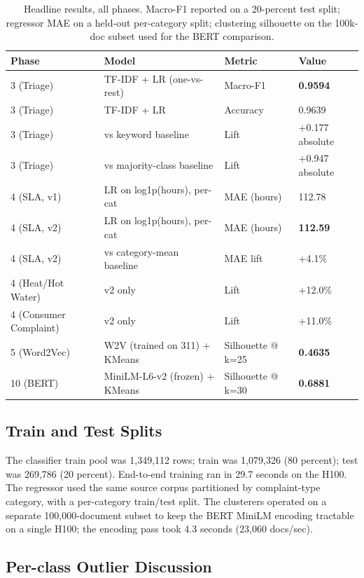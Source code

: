 \documentclass[11pt,letterpaper]{article}
\begin{document}
\begin{table}[h]
\centering
\small
\begin{tabular}{llll}
\toprule
\textbf{Phase} & \textbf{Model} & \textbf{Metric} & \textbf{Value} \\
\midrule
3 (Triage) & TF-IDF + LR (one-vs-rest) & Macro-F1 & \textbf{0.9594} \\
3 (Triage) & TF-IDF + LR & Accuracy & 0.9639 \\
3 (Triage) & vs keyword baseline & Lift & +0.177 absolute \\
3 (Triage) & vs majority-class baseline & Lift & +0.947 absolute \\
\midrule
4 (SLA, v1) & LR on log1p(hours), per-cat & MAE (hours) & 112.78 \\
4 (SLA, v2) & LR on log1p(hours), per-cat & MAE (hours) & \textbf{112.59} \\
4 (SLA, v2) & vs category-mean baseline & MAE lift & +4.1\% \\
4 (Heat/Hot Water) & v2 only & Lift & +12.0\% \\
4 (Consumer Complaint) & v2 only & Lift & +11.0\% \\
\midrule
5 (Word2Vec) & W2V (trained on 311) + KMeans & Silhouette @ k=25 & \textbf{0.4635} \\
10 (BERT) & MiniLM-L6-v2 (frozen) + KMeans & Silhouette @ k=30 & \textbf{0.6881} \\
\bottomrule
\end{tabular}
\caption{Headline results, all phases. Macro-F1 reported on a 20-percent test split; regressor MAE on a held-out per-category split; clustering silhouette on the 100k-doc subset used for the BERT comparison.}
\end{table}

\subsection{Train and Test Splits}

The classifier train pool was 1,349,112 rows; train was 1,079,326 (80 percent); test was 269,786 (20 percent). End-to-end training ran in 29.7 seconds on the H100. The regressor used the same source corpus partitioned by complaint-type category, with a per-category train/test split. The clusterers operated on a separate 100,000-document subset to keep the BERT MiniLM encoding tractable on a single H100; the encoding pass took 4.3 seconds (23,060 docs/sec).

\subsection{Per-class Outlier Discussion}
\end{document}
